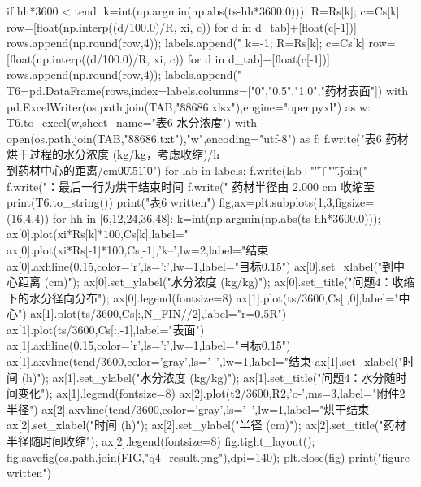 \begin{codelisting}
        if hh*3600 < tend:
            k=int(np.argmin(np.abs(ts-hh*3600.0))); R=Rs[k]; c=Cs[k]
            row=[float(np.interp((d/100.0)/R, xi, c)) for d in d_tab]+[float(c[-1])]
            rows.append(np.round(row,4)); labels.append("%
    k=-1; R=Rs[k]; c=Cs[k]
    row=[float(np.interp((d/100.0)/R, xi, c)) for d in d_tab]+[float(c[-1])]
    rows.append(np.round(row,4)); labels.append("%
    T6=pd.DataFrame(rows,index=labels,columns=["0","0.5","1.0","药材表面"])
    with pd.ExcelWriter(os.path.join(TAB,"\u88686.xlsx"),engine="openpyxl") as w:
        T6.to_excel(w,sheet_name="表6 水分浓度")
    with open(os.path.join(TAB,"\u88686.txt"),"w",encoding="utf-8") as f:
        f.write("表6 药材烘干过程的水分浓度 (kg/kg，考虑收缩)/h\\到药材中心的距离/cm\t0\t0.5\t1.0\n")
        for lab in labels: f.write(lab+"\t"+"\t".join("%
        f.write("：最后一行为烘干结束时间 %
        f.write("    药材半径由 2.000 cm 收缩至 %
    print(T6.to_string())
    print("表6 written")
    fig,ax=plt.subplots(1,3,figsize=(16,4.4))
    for hh in [6,12,24,36,48]:
        k=int(np.argmin(np.abs(ts-hh*3600.0))); ax[0].plot(xi*Rs[k]*100,Cs[k],label="%
    ax[0].plot(xi*Rs[-1]*100,Cs[-1],'k--',lw=2,label="结束 %
    ax[0].axhline(0.15,color='r',ls=':',lw=1,label="目标0.15")
    ax[0].set_xlabel("到中心距离 (cm)"); ax[0].set_ylabel("水分浓度 (kg/kg)"); ax[0].set_title("问题4：收缩下的水分径向分布"); ax[0].legend(fontsize=8)
    ax[1].plot(ts/3600,Cs[:,0],label="中心")
    ax[1].plot(ts/3600,Cs[:,N_FIN//2],label="r=0.5R")
    ax[1].plot(ts/3600,Cs[:,-1],label="表面")
    ax[1].axhline(0.15,color='r',ls=':',lw=1,label="目标0.15")
    ax[1].axvline(tend/3600,color='gray',ls='--',lw=1,label="结束 %
    ax[1].set_xlabel("时间 (h)"); ax[1].set_ylabel("水分浓度 (kg/kg)"); ax[1].set_title("问题4：水分随时间变化"); ax[1].legend(fontsize=8)
    ax[2].plot(t2/3600,R2,'o-',ms=3,label="附件2 半径")
    ax[2].axvline(tend/3600,color='gray',ls='--',lw=1,label="烘干结束 %
    ax[2].set_xlabel("时间 (h)"); ax[2].set_ylabel("半径 (cm)"); ax[2].set_title("药材半径随时间收缩"); ax[2].legend(fontsize=8)
    fig.tight_layout(); fig.savefig(os.path.join(FIG,"q4_result.png"),dpi=140); plt.close(fig)
    print("figure written")
\end{codelisting}


